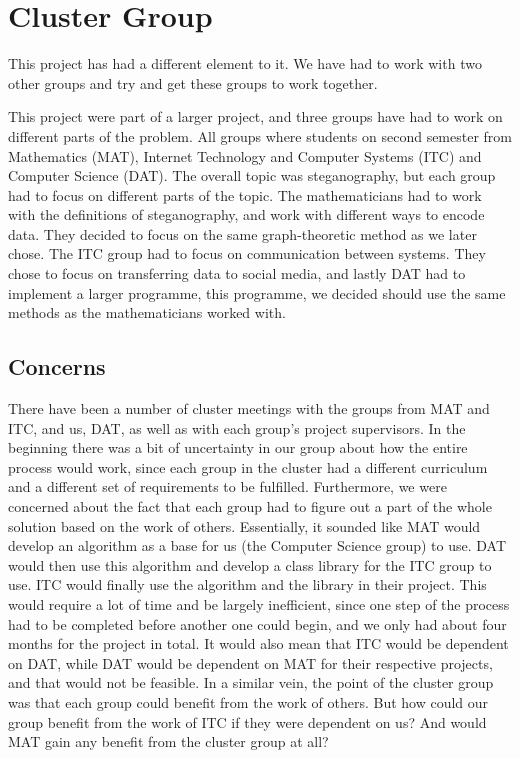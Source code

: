 \section{Cluster Group}
This project has had a different element to it.
We have had to work with two other groups and try and get these groups to work together. 

This project were part of a larger project, and three groups have had to work on different parts of the problem.
All groups where students on second semester from Mathematics (MAT), Internet Technology and Computer Systems (ITC) and Computer Science (DAT).
The overall topic was steganography, but each group had to focus on different parts of the topic.
The mathematicians had to work with the definitions of steganography, and work with different ways to encode data.
They decided to focus on the same graph-theoretic method as we later chose.
The ITC group had to focus on communication between systems.
They chose to focus on transferring data to social media, and lastly DAT had to implement a larger programme, this programme, we decided should use the same methods as the mathematicians worked with.

\subsection*{Concerns}
There have been a number of cluster meetings with the groups from MAT and ITC, and us, DAT, as well as with each group's project supervisors.
In the beginning there was a bit of uncertainty in our group about how the entire process would work, since each group in the cluster had a different curriculum and a different set of requirements to be fulfilled.
Furthermore, we were concerned about the fact that each group had to figure out a part of the whole solution based on the work of others.
Essentially, it sounded like MAT would develop an algorithm as a base for us (the Computer Science group) to use.
DAT would then use this algorithm and develop a class library for the ITC group to use.
ITC would finally use the algorithm and the library in their project.
This would require a lot of time and be largely inefficient, since one step of the process had to be completed before another one could begin, and we only had about four months for the project in total.
It would also mean that ITC would be dependent on DAT, while DAT would be dependent on MAT for their respective projects, and that would not be feasible.
In a similar vein, the point of the cluster group was that each group could benefit from the work of others.
But how could our group benefit from the work of ITC if they were dependent on us? And would MAT gain any benefit from the cluster group at all?

